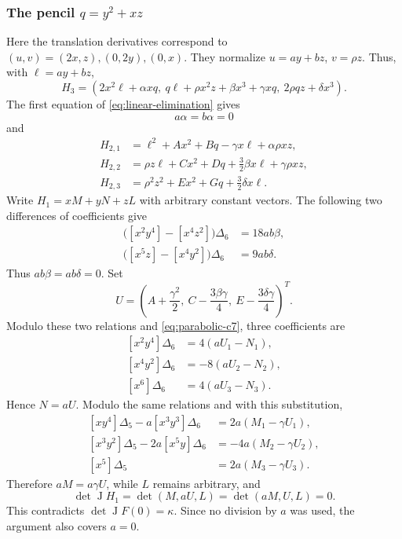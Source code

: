 \documentclass[11pt,reqno]{amsart}
\numberwithin{equation}{section}
\theoremstyle{plain}
\theoremstyle{definition}
\theoremstyle{remark}
\newcommand{\J}{\operatorname J}
\begin{document}
\subsubsection{\texorpdfstring{The pencil $q=y^2+xz$}{The pencil q=y squared+xz}}
Here the translation derivatives correspond to $(u,v)=(2x,z),(0,2y),(0,x)$. They normalize $u=ay+bz$, $v=\rho z$. Thus, with $\ell=ay+bz$,
\begin{equation}\label{eq:parabolic-cubic}
H_3=(2x^2\ell+\alpha xq,\ q\ell+\rho x^2z+\beta x^3+\gamma xq,\ 2\rho qz+\delta x^3).
\end{equation}
The first equation of \eqref{eq:linear-elimination} gives
\begin{equation}\label{eq:parabolic-c7}
a\alpha=b\alpha=0
\end{equation}
and
\begin{equation}\label{eq:parabolic-quadratic}
\begin{split}
H_{2,1}&=\ell^2+Ax^2+Bq-\gamma x\ell+\alpha\rho xz,\\
H_{2,2}&=\rho z\ell+Cx^2+Dq+\tfrac32\beta x\ell+\gamma\rho xz,\\
H_{2,3}&=\rho^2z^2+Ex^2+Gq+\tfrac32\delta x\ell.
\end{split}
\end{equation}
Write $H_1=xM+yN+zL$ with arbitrary constant vectors.
The following two differences of coefficients give
\begin{equation}\label{eq:parabolic-two-relations}
\begin{aligned}
\bigl([x^2y^4]-[x^4z^2]\bigr)\Delta_6&=18ab\beta,\\
\bigl([x^5z]-[x^4y^2]\bigr)\Delta_6&=9ab\delta.
\end{aligned}
\end{equation}
Thus $ab\beta=ab\delta=0$. Set
\[
U=\left(A+\frac{\gamma^2}{2},\
C-\frac{3\beta\gamma}{4},\
E-\frac{3\delta\gamma}{4}\right)^T.
\]
Modulo these two relations and \eqref{eq:parabolic-c7}, three coefficients are
\begin{equation}\label{eq:parabolic-y-column}
\begin{aligned}
[x^2y^4]\Delta_6&=4(aU_1-N_1),\\
[x^4y^2]\Delta_6&=-8(aU_2-N_2),\\
[x^6]\Delta_6&=4(aU_3-N_3).
\end{aligned}
\end{equation}
Hence $N=aU$. Modulo the same relations and with this substitution,
\begin{equation}\label{eq:parabolic-selected}
\begin{aligned}
[xy^4]\Delta_5-a[x^3y^3]\Delta_6&=2a(M_1-\gamma U_1),\\
[x^3y^2]\Delta_5-2a[x^5y]\Delta_6&=-4a(M_2-\gamma U_2),\\
[x^5]\Delta_5&=2a(M_3-\gamma U_3).
\end{aligned}
\end{equation}
Therefore $aM=a\gamma U$, while $L$ remains arbitrary, and
\[
\det\J H_1=\det(M,aU,L)=\det(aM,U,L)=0.
\]
This contradicts $\det\J F(0)=\kappa$. Since no division by $a$ was used,
the argument also covers $a=0$.
\end{document}
